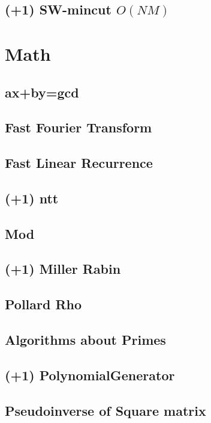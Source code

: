 \documentclass[a4paper,10pt,twocolumn,oneside]{article}
\begin{document}
\subsection{(+1) SW-mincut $O(NM)$}


\section{Math}
\subsection{ax+by=gcd}

\subsection{Fast Fourier Transform}

\subsection{Fast Linear Recurrence}

\subsection{(+1) ntt}

\subsection{Mod}

\subsection{(+1) Miller Rabin}

\subsection{Pollard Rho}

\subsection{Algorithms about Primes}

\subsection{(+1) PolynomialGenerator}

\subsection{Pseudoinverse of Square matrix}

\end{document}
